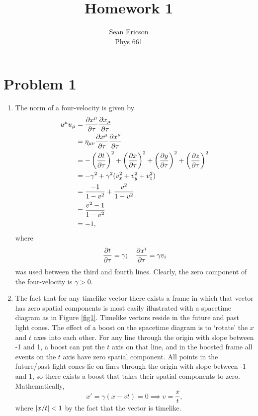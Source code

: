 \documentclass[12pt]{article}
\begin{document}
\title{Homework 1}
\author{Sean Ericson \\ Phys 661}
\maketitle

\section*{Problem 1}
\begin{enumerate}[label=(\alph*)]
    \item The norm of a four-velocity is given by
    \begin{align*}
        u^\mu u_\mu &= \pdv{x^\mu}{\tau}\pdv{x_\mu}{\tau} \\
        &= \eta_{\mu\nu}\pdv{x^\mu}{\tau}\pdv{x^\nu}{\tau} \\
        &= -\left(\pdv{t}{\tau}\right)^2 + \left(\pdv{x}{\tau}\right)^2 +  \left(\pdv{y}{\tau}\right)^2 + \left(\pdv{z}{\tau}\right)^2 \\
        &= -\gamma^2 + \gamma^2(v_x^2 + v_y^2 + v_z^2) \\
        &= \frac{-1}{1-v^2} + \frac{v^2}{1-v^2} \\
        &= \frac{v^2 - 1}{1 - v^2} \\
        &= -1,
    \end{align*}
    where
    \[ \pdv{t}{\tau} = \gamma; \quad \pdv{x^i}{\tau} = \gamma v_i \]
    was used between the third and fourth lines. Clearly, the zero component of the four-velocity is $\gamma > 0$.

    \item The fact that for any timelike vector there exists a frame in which that vector has zero spatial components is most easily illustrated with a spacetime diagram as in Figure \ref{fig1}. Timelike vectors reside in the future and past light cones. The effect of a boost on the spacetime diagram is to `rotate' the $x$ and $t$ axes into each other. For any line through the origin with slope between -1 and 1, a boost can put the $t$ axis on that line, and in the boosted frame all events on the $t$ axis have zero spatial component. All points in the future/past light cones lie on lines through the origin with slope between -1 and 1, so there exists a boost that takes their spatial components to zero. Mathematically, 
    \[ x' = \gamma(x - vt) = 0 \implies v = \frac{x}{t}, \]
    where $\abs{x/t} < 1$ by the fact that the vector is timelike.
    \begin{figure}
        \centering
\end{figure}
\end{enumerate}
\end{document}
